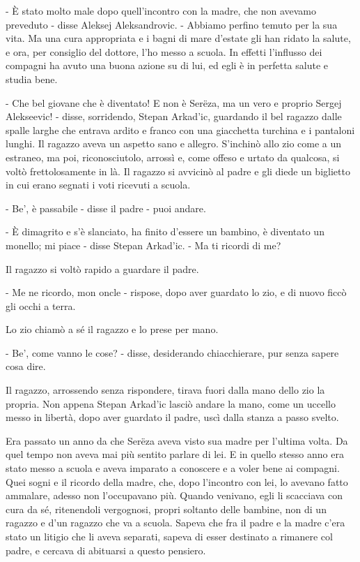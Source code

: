 - È stato molto male dopo quell'incontro con la madre, che non avevamo preveduto - disse Aleksej Aleksandrovic. - Abbiamo perfino temuto per la sua vita. Ma una cura appropriata e i bagni di mare d'estate gli han ridato la salute, e ora, per consiglio del dottore, l'ho messo a scuola. In effetti l'influsso dei compagni ha avuto una buona azione su di lui, ed egli è in perfetta salute e studia bene. 

- Che bel giovane che è diventato! E non è Serëza, ma un vero e proprio Sergej Alekseevic! - disse, sorridendo, Stepan Arkad'ic, guardando il bel ragazzo dalle spalle larghe che entrava ardito e franco con una giacchetta turchina e i pantaloni lunghi. Il ragazzo aveva un aspetto sano e allegro. S'inchinò allo zio come a un estraneo, ma poi, riconosciutolo, arrossì e, come offeso e urtato da qualcosa, si voltò frettolosamente in là. Il ragazzo si avvicinò al padre e gli diede un biglietto in cui erano segnati i voti ricevuti a scuola. 

- Be', è passabile - disse il padre - puoi andare. 

- È dimagrito e s'è slanciato, ha finito d'essere un bambino, è diventato un monello; mi piace - disse Stepan Arkad'ic. - Ma ti ricordi di me? 

Il ragazzo si voltò rapido a guardare il padre. 

- Me ne ricordo, mon oncle - rispose, dopo aver guardato lo zio, e di nuovo ficcò gli occhi a terra. 

Lo zio chiamò a sé il ragazzo e lo prese per mano. 

- Be', come vanno le cose? - disse, desiderando chiacchierare, pur senza sapere cosa dire. 

Il ragazzo, arrossendo senza rispondere, tirava fuori dalla mano dello zio la propria. Non appena Stepan Arkad'ic lasciò andare la mano, come un uccello messo in libertà, dopo aver guardato il padre, uscì dalla stanza a passo svelto. 

Era passato un anno da che Serëza aveva visto sua madre per l'ultima volta. Da quel tempo non aveva mai più sentito parlare di lei. E in quello stesso anno era stato messo a scuola e aveva imparato a conoscere e a voler bene ai compagni. Quei sogni e il ricordo della madre, che, dopo l'incontro con lei, lo avevano fatto ammalare, adesso non l'occupavano più. Quando venivano, egli li scacciava con cura da sé, ritenendoli vergognosi, propri soltanto delle bambine, non di un ragazzo e d'un ragazzo che va a scuola. Sapeva che fra il padre e la madre c'era stato un litigio che li aveva separati, sapeva di esser destinato a rimanere col padre, e cercava di abituarsi a questo pensiero. 

